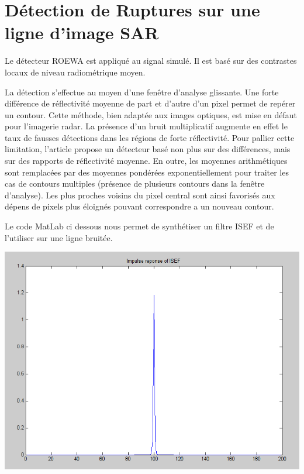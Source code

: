 \documentclass[a4paper,11pt]{article}
\newcommand{\FSource}[1]{%
  
  }
\begin{document}
\vspace{0.5cm}

\newpage

\section{Détection de Ruptures sur une ligne d'image SAR}

Le détecteur ROEWA est appliqué au signal simulé. Il est basé sur des contrastes locaux
de niveau radiométrique moyen.

La détection s'effectue au moyen d'une fenêtre d'analyse glissante. Une forte différence
de réflectivité moyenne de part et d'autre d'un pixel permet de repérer un contour. Cette
méthode, bien adaptée aux images optiques, est mise en défaut pour l'imagerie radar.
La présence d'un bruit multiplicatif augmente en effet le taux de fausses détections
dans les régions de forte réflectivité. Pour pallier cette limitation, l'article propose
un détecteur basé non plus sur des différences, mais sur des rapports de réflectivité
moyenne. En outre, les moyennes arithmétiques sont remplacées par des moyennes
pondérées exponentiellement pour traiter les cas de contours multiples (présence de
plusieurs contours dans la fenêtre d'analyse). Les plus proches voisins du pixel central sont 
ainsi favorisés aux dépens de pixels plus éloignés pouvant correspondre a un
nouveau contour.

Le code MatLab ci dessous nous permet de synthétiser un filtre ISEF et de l'utiliser sur une
ligne bruitée.

\vspace{0.5cm}

\FSource{matlab/6.m}

\vspace{0.5cm}

\includegraphics[width=15cm]{capture/filtre.png}
\end{document}
